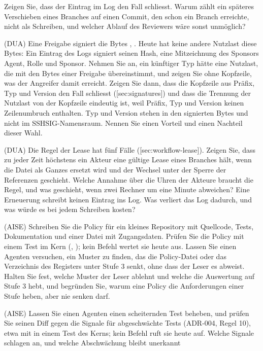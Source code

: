Zeigen Sie, dass der Eintrag im Log den Fall schliesst.
Warum zählt ein späteres Verschieben eines Branches auf einen Commit,
den schon ein Branch erreichte, nicht als Schreiben,
und welcher Ablauf des Reviewers wäre sonst unmöglich?
\item (DUA) Eine Freigabe signiert die Bytes , .
Heute hat keine andere Nutzlast diese Bytes: Ein Eintrag des Logs signiert seinen Hash,
eine Mitzeichnung des Sponsors Agent, Rolle und Sponsor.
Nehmen Sie an, ein künftiger Typ hätte eine Nutzlast, die mit den Bytes einer Freigabe
übereinstimmt, und zeigen Sie ohne Kopfzeile, was der Angreifer damit erreicht.
Zeigen Sie dann, dass die Kopfzeile aus Präfix, Typ und Version den Fall schliesst
([sec:signatures]) und dass die Trennung der Nutzlast von der Kopfzeile eindeutig ist,
weil Präfix, Typ und Version keinen Zeilenumbruch enthalten.
Typ und Version stehen in den signierten Bytes und nicht im SSHSIG-Namensraum.
Nennen Sie einen Vorteil und einen Nachteil dieser Wahl.
\item (DUA) Die Regel der Lease hat fünf Fälle ([sec:workflow-lease]).
Zeigen Sie, dass zu jeder Zeit höchstens ein Akteur eine gültige Lease eines Branches hält,
wenn die Datei als Ganzes ersetzt wird und der Wechsel unter der Sperre der Referenzen geschieht.
Welche Annahme über die Uhren der Akteure braucht die Regel,
und was geschieht, wenn zwei Rechner um eine Minute abweichen?
Eine Erneuerung schreibt keinen Eintrag ins Log.
Was verliert das Log dadurch, und was würde es bei jedem Schreiben kosten?
\item (AISE) Schreiben Sie die Policy für ein kleines Repository mit Quellcode, Tests,
Dokumentation und einer Datei mit Zugangsdaten.
Prüfen Sie die Policy mit einem Test im Kern (, );
kein Befehl wertet sie heute aus.
Lassen Sie einen Agenten versuchen, ein Muster zu finden, das die Policy-Datei
oder das Verzeichnis des Registers unter Stufe 3 senkt, ohne dass der Leser es abweist.
Halten Sie fest, welche Muster der Leser ablehnt und welche die Auswertung auf Stufe 3 hebt,
und begründen Sie, warum eine Policy die Anforderungen einer Stufe heben, aber nie senken darf.
\item (AISE) Lassen Sie einen Agenten einen scheiternden Test beheben,
und prüfen Sie seinen Diff gegen die Signale für abgeschwächte Tests (ADR-004, Regel 10),
etwa mit  in einem Test des Kerns; kein Befehl ruft sie heute auf.
Welche Signale schlagen an, und welche Abschwächung bleibt unerkannt

